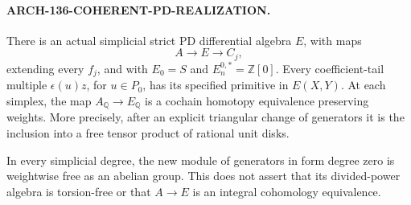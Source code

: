 \paragraph{ARCH-136-COHERENT-PD-REALIZATION.}
There is an actual simplicial strict PD differential algebra
\(E\), with maps
\[
                  A\longrightarrow E\longrightarrow C_j,
                                                               \tag{136.CP4}
\]
extending every \(f_j\), and with \(E_0=S\) and
\(E_n^{0,*}=\mathbb Z[0]\). Every coefficient-tail multiple
\(\epsilon(u)z\), for \(u\in P_0\), has its specified
primitive in \(E(X,Y)\). At each simplex, the map
\(A_{\mathbb Q}\to E_{\mathbb Q}\) is a cochain homotopy
equivalence preserving weights. More precisely, after an
explicit triangular change of generators it is the inclusion
into a free tensor product of rational unit disks.

In every simplicial degree, the new module of generators in
form degree zero is weightwise free as an abelian group. This
does not assert that its divided-power algebra is torsion-free
or that \(A\to E\) is an integral cohomology equivalence.

